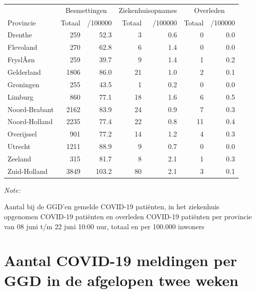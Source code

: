 \documentclass[
  english,
  man,floatsintext]{apa6}
\begin{document}
\begin{table}
\centering
\begin{threeparttable}
\begin{tabular}{lrrrrrr}
\toprule
\multicolumn{1}{c}{ } & \multicolumn{2}{c}{Besmettingen} & \multicolumn{2}{c}{Ziekenhuisopnames} & \multicolumn{2}{c}{Overleden} \\
\cmidrule(l{3pt}r{3pt}){2-3} \cmidrule(l{3pt}r{3pt}){4-5} \cmidrule(l{3pt}r{3pt}){6-7}
Provincie & Totaal & /100000 & Totaal & /100000 & Totaal & /100000\\
\midrule
Drenthe & 259 & 52.3 & 3 & 0.6 & 0 & 0.0\\
Flevoland & 270 & 62.8 & 6 & 1.4 & 0 & 0.0\\
FryslÃ¢n & 259 & 39.7 & 9 & 1.4 & 1 & 0.2\\
Gelderland & 1806 & 86.0 & 21 & 1.0 & 2 & 0.1\\
Groningen & 255 & 43.5 & 1 & 0.2 & 0 & 0.0\\
Limburg & 860 & 77.1 & 18 & 1.6 & 6 & 0.5\\
Noord-Brabant & 2162 & 83.9 & 24 & 0.9 & 7 & 0.3\\
Noord-Holland & 2235 & 77.4 & 22 & 0.8 & 11 & 0.4\\
Overijssel & 901 & 77.2 & 14 & 1.2 & 4 & 0.3\\
Utrecht & 1211 & 88.9 & 9 & 0.7 & 0 & 0.0\\
Zeeland & 315 & 81.7 & 8 & 2.1 & 1 & 0.3\\
Zuid-Holland & 3849 & 103.2 & 80 & 2.1 & 3 & 0.1\\
\bottomrule
\end{tabular}
\begin{tablenotes}
\item \textit{Note: } 
\item Aantal bij de GGD’en gemelde COVID-19 patiënten, in het ziekenhuis opgenomen COVID-19 patiënten en overleden COVID-19 patiënten per provincie van 08 juni t/m 22 juni 10:00 uur, totaal en per 100.000 inwoners
\end{tablenotes}
\end{threeparttable}
\end{table}

\newpage

\hypertarget{aantal-covid-19-meldingen-per-ggd-in-de-afgelopen-twee-weken}{%
\section{Aantal COVID-19 meldingen per GGD in de afgelopen twee weken}\label{aantal-covid-19-meldingen-per-ggd-in-de-afgelopen-twee-weken}}
\end{document}
